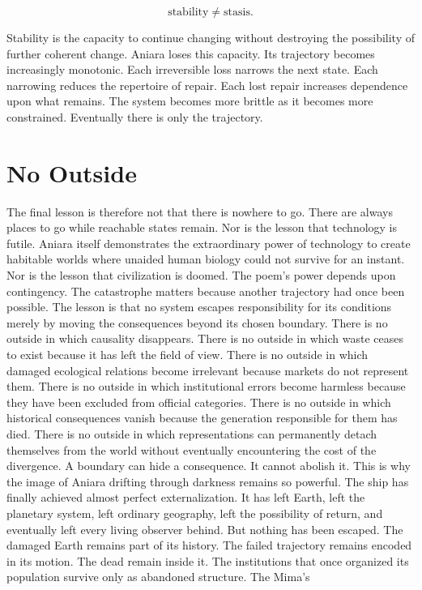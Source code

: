 \documentclass[11pt,oneside]{book}
\theoremstyle{definition}
\theoremstyle{remark}
\begin{document}
\[
\text{stability} \neq \text{stasis}.
\]

Stability is the capacity to continue changing without destroying the possibility of further
coherent change. Aniara loses this capacity. Its trajectory becomes increasingly monotonic. Each
irreversible loss narrows the next state. Each narrowing reduces the repertoire of repair. Each lost
repair increases dependence upon what remains. The system becomes more brittle as it becomes more
constrained. Eventually there is only the trajectory.

\section*{No Outside}

The final lesson is therefore not that there is nowhere to go. There are always places to go while
reachable states remain. Nor is the lesson that technology is futile. Aniara itself demonstrates the
extraordinary power of technology to create habitable worlds where unaided human biology could not
survive for an instant. Nor is the lesson that civilization is doomed. The poem's power depends upon
contingency. The catastrophe matters because another trajectory had once been possible. The lesson
is that no system escapes responsibility for its conditions merely by moving the consequences beyond
its chosen boundary. There is no outside in which causality disappears. There is no outside in which
waste ceases to exist because it has left the field of view. There is no outside in which damaged
ecological relations become irrelevant because markets do not represent them. There is no outside in
which institutional errors become harmless because they have been excluded from official categories.
There is no outside in which historical consequences vanish because the generation responsible for
them has died. There is no outside in which representations can permanently detach themselves from
the world without eventually encountering the cost of the divergence. A boundary can hide a
consequence. It cannot abolish it. This is why the image of Aniara drifting through darkness remains
so powerful. The ship has finally achieved almost perfect externalization. It has left Earth, left
the planetary system, left ordinary geography, left the possibility of return, and eventually left
every living observer behind. But nothing has been escaped. The damaged Earth remains part of its
history. The failed trajectory remains encoded in its motion. The dead remain inside it. The
institutions that once organized its population survive only as abandoned structure. The Mima's
\end{document}
